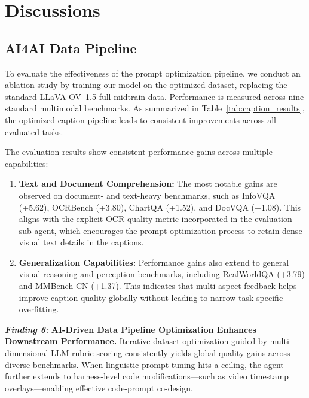 \section{Discussions}

\subsection{AI4AI Data Pipeline}
\label{subsec:caption_prompt_ablation}

To evaluate the effectiveness of the prompt optimization pipeline, we conduct an ablation study by training our model on the optimized dataset, replacing the standard LLaVA-OV~1.5 full midtrain data. Performance is measured across nine standard multimodal benchmarks. As summarized in Table~\ref{tab:caption_results}, the optimized caption pipeline leads to consistent improvements across all evaluated tasks.



The evaluation results show consistent performance gains across multiple capabilities:
\begin{enumerate}
    \item \textbf{Text and Document Comprehension:} The most notable gains are observed on document- and text-heavy benchmarks, such as InfoVQA (+5.62), OCRBench (+3.80), ChartQA (+1.52), and DocVQA (+1.08). This aligns with the explicit OCR quality metric incorporated in the evaluation sub-agent, which encourages the prompt optimization process to retain dense visual text details in the captions.
    \item \textbf{Generalization Capabilities:} Performance gains also extend to general visual reasoning and perception benchmarks, including RealWorldQA (+3.79) and MMBench-CN (+1.37). This indicates that multi-aspect feedback helps improve caption quality globally without leading to narrow task-specific overfitting.
\end{enumerate}

\begin{promptbox}
\large
\textbf{\textit{Finding 6:}}
\textbf{AI-Driven Data Pipeline Optimization Enhances Downstream Performance.}
Iterative dataset optimization guided by multi-dimensional LLM rubric scoring consistently yields global quality gains across diverse benchmarks. When linguistic prompt tuning hits a ceiling, the agent further extends to harness-level code modifications—such as video timestamp overlays—enabling effective code-prompt co-design.
\end{promptbox}


